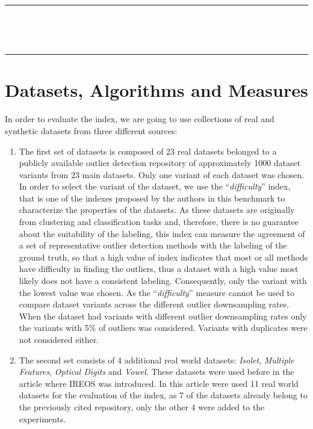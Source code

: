 \documentclass[11pt]{article}
\newcommand{\horrule}[1]{\rule{\linewidth}{#1}} %
\begin{document}
\smallskip

\normalfont \normalsize 
\horrule{0.5pt} \\[0.4cm] %
{ \\ %
\horrule{2pt} %

\linespread{1.5}
\justify

\section{Datasets, Algorithms and Measures}
In order to evaluate the index, we are going to use collections of real and synthetic datasets from three different sources:
\begin{enumerate}
	\item The first set of datasets is composed of 23 real datasets belonged to a publicly available outlier detection repository of approximately 1000 dataset variants from 23 main datasets\cite{campos2016}. Only one variant of each dataset was chosen. In order to select the variant of the dataset, we use the ``\textit{difficulty}'' index, that is one of the indexes proposed by the authors in this benchmark to characterize the properties of the datasets. As these datasets are originally from clustering and classification tasks and, therefore, there is no guarantee about the suitability of the labeling, this index can measure the agreement of a set of representative outlier detection methods with the labeling of the ground truth, so that a high value of index indicates that most or all methods have difficulty in finding the outliers, thus a dataset with a high value most likely does not have a consistent labeling. Consequently, only the variant with the lowest value was chosen. As the ``\textit{difficulty}'' measure cannot be used to compare dataset variants across the different outlier downsampling rates. When the dataset had variants with different outlier downsampling rates only the variants with 5\% of outliers was considered. Variants with duplicates were not considered either.
	\item The second set consists of 4 additional real world datasets: \textit{Isolet}, \textit{Multiple Features}, \textit{Optical Digits} and \textit{Vowel}. These datasets were used before in the article where IREOS was introduced\cite{marques2015}. In this article were used 11 real world datasets for the evaluation of the index, as 7 of the datasets already belong to the previously cited repository, only the other 4 were added to the experiments. 

\end{enumerate}}
\end{document}
